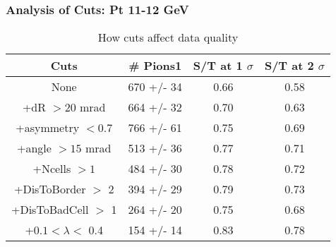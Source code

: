 \frame
{
\frametitle{Analysis of Cuts: Pt 11-12 GeV}
\begin{table}
\caption{How cuts affect data quality}
\centering
\begin{tabular}{c c c c}
\hline\hline
Cuts & \# Pions1 & S/T at 1 $\sigma$ & S/T at 2 $\sigma$ \\ [0.5ex]
\hline
None &  670 +/-   34 & 0.66 & 0.58 \\ %
+dR $> 20$ mrad &  664 +/-   32 & 0.70 & 0.63 \\ %
+asymmetry $< 0.7$ &  766 +/-   61 & 0.75 & 0.69 \\ %
+angle $> 15$ mrad &  513 +/-   36 & 0.77 & 0.71 \\ %
+Ncells $> 1$&  484 +/-   30 & 0.78 & 0.72 \\ %
+DisToBorder $>$ 2 &  394 +/-   29 & 0.79 & 0.73 \\ %
+DisToBadCell $>$ 1&  264 +/-   20 & 0.75 & 0.68 \\ %
+$0.1 < \lambda <$ 0.4 &  154 +/-   14 & 0.83 & 0.78 \\ %
[1ex]
\hline
\end{tabular}
\label{table:nonlin}
\end{table}
}
